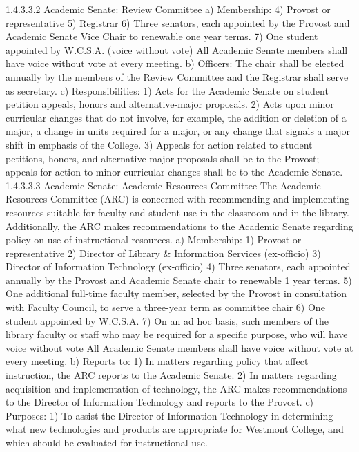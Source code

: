 \documentclass[letterpaper, 11pt]{article}
\begin{document}
			1.4.3.3.2 Academic Senate:  Review Committee
			a) Membership:
			4) Provost or representative
			5) Registrar
			6) Three senators, each appointed by the Provost and Academic Senate Vice Chair to renewable one year terms.
			7) One student appointed by W.C.S.A. (voice without vote)
			All Academic Senate members shall have voice without vote at every meeting.
			b) Officers:
			The chair shall be elected annually by the members of the Review Committee and the Registrar shall serve as secretary.
			c) Responsibilities:
			1) Acts for the Academic Senate on student petition appeals, honors and alternative-major proposals.
			2) Acts upon minor curricular changes that do not involve, for example, the addition or deletion of a major, a change in units required for a major, or any change that signals a major shift in emphasis of the College.
			3) Appeals for action related to student petitions, honors, and alternative-major proposals shall be to the Provost; appeals for action to minor curricular changes shall be to the Academic Senate.
			1.4.3.3.3 Academic Senate:  Academic Resources Committee
			The Academic Resources Committee (ARC) is concerned with recommending and implementing resources suitable for faculty and student use in the classroom and in the library.  Additionally, the ARC makes recommendations to the Academic Senate regarding policy on use of instructional resources.
			a) Membership:
			1) Provost or representative
			2) Director of Library \& Information Services (ex-officio)
			3) Director of Information Technology (ex-officio)
			4) Three senators, each appointed annually by the Provost and Academic Senate chair to renewable 1 year terms.
			5) One additional full-time faculty member, selected by the Provost in consultation with Faculty Council, to serve a three-year term as committee chair
			6) One student appointed by W.C.S.A.
			7) On an ad hoc basis, such members of the library faculty or staff who may be required for a specific purpose, who will have voice without vote
			All Academic Senate members shall have voice without vote at every meeting.
			b) Reports to:
			1) In matters regarding policy that affect instruction, the ARC reports to the Academic Senate.
			2) In matters regarding acquisition and implementation of technology, the ARC makes recommendations to the Director of Information Technology and reports to the Provost.
			c) Purposes:
			1) To assist the Director of Information Technology in determining what new technologies and products are appropriate for Westmont College, and which should be evaluated for instructional use.
\end{document}
